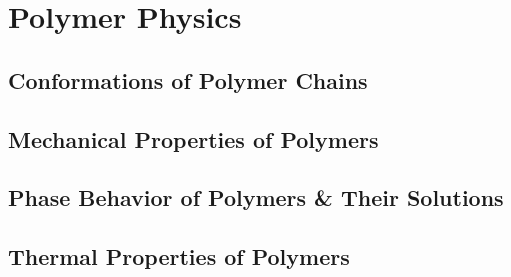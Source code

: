 \documentclass[book]{pogil}
\begin{document}
\part{Polymer Physics}

	\chapter{Conformations of Polymer Chains}

	\chapter{Mechanical Properties of Polymers}
		
		

	\chapter{Phase Behavior of Polymers \& Their Solutions}
		
		
		

	\chapter{Thermal Properties of Polymers}





\backmatter
\end{document}
